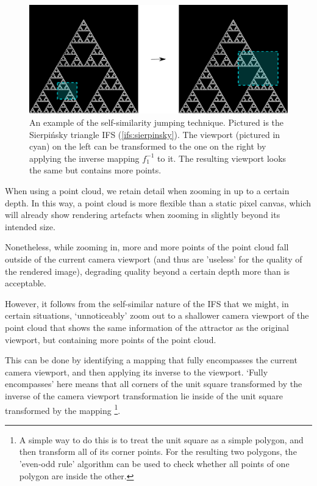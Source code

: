 \documentclass[11pt]{article}
\begin{document}
\begin{figure}

\includegraphics[width=\textwidth]{figures/sierpinsky_jump}
\caption{An example of the self-similarity jumping technique. Pictured is the Sierpi\'nsky triangle IFS (\autoref{ifs:sierpinsky}).
The viewport (pictured in cyan) on the left can be transformed to the one on the right by applying the inverse mapping $f_1^{-1}$ to it.
The resulting viewport looks the same but contains more points.}
\label{figure:sierpinsky_jump}
\end{figure}

When using a point cloud, we retain detail when zooming in up to a certain depth. In this way, a point cloud is more flexible than a 
static pixel canvas, which will already show rendering artefacts when zooming in slightly beyond its intended size.

Nonetheless, while zooming in, more and more points of the point cloud fall outside of the current camera viewport
(and thus are 'useless' for the quality of the rendered image), degrading quality beyond a certain depth more than is acceptable.

However, it follows from the self-similar nature of the IFS that we might, in certain situations,
`unnoticeably' zoom out to a shallower camera viewport of the point cloud that shows the same information of the attractor
as the original viewport, but containing more points of the point cloud.

This can be done by identifying a mapping that fully encompasses the current camera viewport, and then applying its inverse
to the viewport.
`Fully encompasses' here means that 
all corners of the unit square transformed by the inverse of the camera viewport transformation
lie inside of the unit square transformed by the mapping \footnote{A simple way to do this is to treat the unit square as a simple polygon,
and then transform all of its corner points. For the resulting two polygons, the 'even-odd rule' algorithm
\cite{haines1994point}
can be used to check whether all points of one polygon are inside the other.}.
\end{document}
